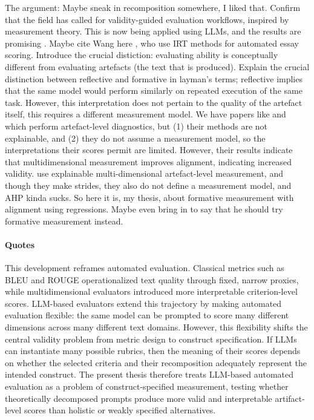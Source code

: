The argument:
Maybe sneak in recomposition somewhere, I liked that.
Confirm that the field has called for validity-guided evaluation workflows, inspired by measurement theory. This is now being applied using LLMs, and the results are promising \citep{raoAutorubricUnifiedFramework2026, robertsonIdentityLinkIRTLabelFree2025}. Maybe cite Wang here \citep{wang2025evaluating}, who use IRT methods for automated essay scoring. Introduce the crucial distiction: evaluating ability is conceptually different from evaluating artefacts (the text that is produced). Explain the crucial distinction between reflective and formative in layman's terms; reflective implies that the same model would perform similarly on repeated execution of the same task. However, this interpretation does not pertain to the quality of the artefact itself, this requires a different measurement model. We have papers like \citet{hashemi_llm-rubric_2024} and \citet{kolaSAJASimpleApproach2026} which perform artefact-level diagnostics, but (1) their methods are not explainable, and (2) they do not assume a measurement model, so the interpretations their scores permit are limited. However, their results indicate that multidimensional measurement improves alignment, indicating increased validity. \citet{bang_transforming_2025} use explainable multi-dimensional artefact-level measurement, and though they make strides, they also do not define a measurement model, and AHP kinda sucks. So here it is, my thesis, about formative measurement with alignment using regressions. Maybe even bring in \citet{yangLLMMeasureGeneratingValid2024} to say that he should try formative measurement instead.

\paragraph{Quotes}

This development reframes automated evaluation. Classical metrics such as BLEU and ROUGE operationalized text quality through fixed, narrow proxies, while multidimensional evaluators introduced more interpretable criterion-level scores. LLM-based evaluators extend this trajectory by making automated evaluation flexible: the same model can be prompted to score many different dimensions across many different text domains. However, this flexibility shifts the central validity problem from metric design to construct specification. If LLMs can instantiate many possible rubrics, then the meaning of their scores depends on whether the selected criteria and their recomposition adequately represent the intended construct. The present thesis therefore treats LLM-based automated evaluation as a problem of construct-specified measurement, testing whether theoretically decomposed prompts produce more valid and interpretable artifact-level scores than holistic or weakly specified alternatives.

